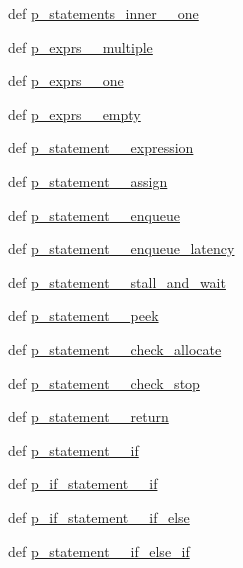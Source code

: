 \begin{DoxyCompactItemize}
def \hyperlink{classslicc_1_1parser_1_1SLICC_a7efc1b878dacc061e3542ce6b8ab68c6}{p\_\-statements\_\-inner\_\-\_\-one}
\item 
def \hyperlink{classslicc_1_1parser_1_1SLICC_aca3f4f9507d6ed2ece13aaaaec53253d}{p\_\-exprs\_\-\_\-multiple}
\item 
def \hyperlink{classslicc_1_1parser_1_1SLICC_a2a5be72f88e35eafedd318c800efae05}{p\_\-exprs\_\-\_\-one}
\item 
def \hyperlink{classslicc_1_1parser_1_1SLICC_af484cfb1cda74b81011444d62fd07873}{p\_\-exprs\_\-\_\-empty}
\item 
def \hyperlink{classslicc_1_1parser_1_1SLICC_a21197ae4e4e8767d8c174b973ccac760}{p\_\-statement\_\-\_\-expression}
\item 
def \hyperlink{classslicc_1_1parser_1_1SLICC_a7b64a5e27ad61d766e32b878ff3217b1}{p\_\-statement\_\-\_\-assign}
\item 
def \hyperlink{classslicc_1_1parser_1_1SLICC_aa24de70d62c542b3a2c70537e8d9c545}{p\_\-statement\_\-\_\-enqueue}
\item 
def \hyperlink{classslicc_1_1parser_1_1SLICC_a125c36bced168577e807e3f9b7db389d}{p\_\-statement\_\-\_\-enqueue\_\-latency}
\item 
def \hyperlink{classslicc_1_1parser_1_1SLICC_ab264a56ec5a28193c392750e09800825}{p\_\-statement\_\-\_\-stall\_\-and\_\-wait}
\item 
def \hyperlink{classslicc_1_1parser_1_1SLICC_a015764d4d63d518e62c8b10217683dee}{p\_\-statement\_\-\_\-peek}
\item 
def \hyperlink{classslicc_1_1parser_1_1SLICC_a34a751b0b1ff323ed683da56c391c461}{p\_\-statement\_\-\_\-check\_\-allocate}
\item 
def \hyperlink{classslicc_1_1parser_1_1SLICC_a61a8619e79455f83956fe1eb357b5b7f}{p\_\-statement\_\-\_\-check\_\-stop}
\item 
def \hyperlink{classslicc_1_1parser_1_1SLICC_a2e1afae014e0dda4da7c49f97517b021}{p\_\-statement\_\-\_\-return}
\item 
def \hyperlink{classslicc_1_1parser_1_1SLICC_ac287a4eaf1f470dda1b42833534325c0}{p\_\-statement\_\-\_\-if}
\item 
def \hyperlink{classslicc_1_1parser_1_1SLICC_ac1f5450666ded9c4ac432e45daf7b9ef}{p\_\-if\_\-statement\_\-\_\-if}
\item 
def \hyperlink{classslicc_1_1parser_1_1SLICC_aadbf6d6104de9ce2070a4a62693b16b3}{p\_\-if\_\-statement\_\-\_\-if\_\-else}
\item 
def \hyperlink{classslicc_1_1parser_1_1SLICC_a88b968b14aa256d7c90f277a2557cb8c}{p\_\-statement\_\-\_\-if\_\-else\_\-if}

\end{DoxyCompactItemize}
